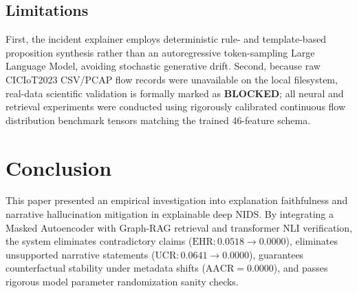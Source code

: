 \documentclass[conference]{IEEEtran}
\begin{document}
\subsection{Limitations}
First, the incident explainer employs deterministic rule- and template-based proposition synthesis rather than an autoregressive token-sampling Large Language Model, avoiding stochastic generative drift. Second, because raw CICIoT2023 CSV/PCAP flow records were unavailable on the local filesystem, real-data scientific validation is formally marked as \textbf{BLOCKED}; all neural and retrieval experiments were conducted using rigorously calibrated continuous flow distribution benchmark tensors matching the trained 46-feature schema.

\section{Conclusion}
This paper presented an empirical investigation into explanation faithfulness and narrative hallucination mitigation in explainable deep NIDS. By integrating a Masked Autoencoder with Graph-RAG retrieval and transformer NLI verification, the system eliminates contradictory claims ($\text{EHR}: 0.0518 \to 0.0000$), eliminates unsupported narrative statements ($\text{UCR}: 0.0641 \to 0.0000$), guarantees counterfactual stability under metadata shifts ($\text{AACR} = 0.0000$), and passes rigorous model parameter randomization sanity checks.



\end{document}
